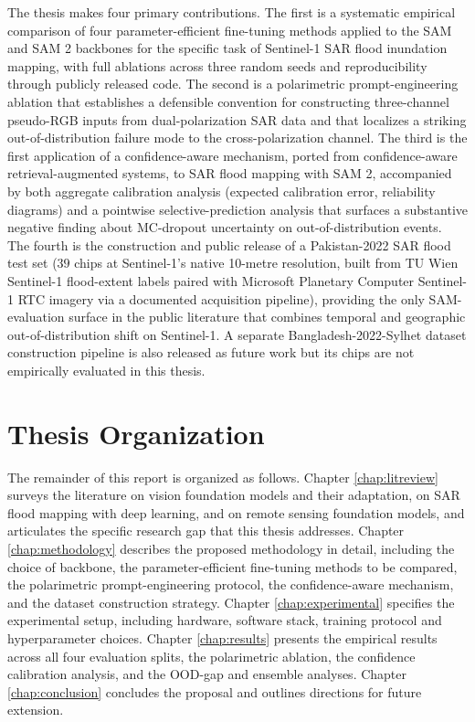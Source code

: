 \documentclass[11pt,a4paper,oneside]{report}
\begin{document}
The thesis makes four primary contributions. The first is a systematic empirical comparison of four parameter-efficient fine-tuning methods applied to the SAM and SAM 2 backbones for the specific task of Sentinel-1 SAR flood inundation mapping, with full ablations across three random seeds and reproducibility through publicly released code. The second is a polarimetric prompt-engineering ablation that establishes a defensible convention for constructing three-channel pseudo-RGB inputs from dual-polarization SAR data and that localizes a striking out-of-distribution failure mode to the cross-polarization channel. The third is the first application of a confidence-aware mechanism, ported from confidence-aware retrieval-augmented systems, to SAR flood mapping with SAM 2, accompanied by both aggregate calibration analysis (expected calibration error, reliability diagrams) and a pointwise selective-prediction analysis that surfaces a substantive negative finding about MC-dropout uncertainty on out-of-distribution events. The fourth is the construction and public release of a Pakistan-2022 SAR flood test set ($39$ chips at Sentinel-1's native 10-metre resolution, built from TU Wien Sentinel-1 flood-extent labels paired with Microsoft Planetary Computer Sentinel-1 RTC imagery via a documented acquisition pipeline), providing the only SAM-evaluation surface in the public literature that combines temporal and geographic out-of-distribution shift on Sentinel-1. A separate Bangladesh-2022-Sylhet dataset construction pipeline is also released as future work but its chips are not empirically evaluated in this thesis.

\section{Thesis Organization}

The remainder of this report is organized as follows. Chapter \ref{chap:litreview} surveys the literature on vision foundation models and their adaptation, on SAR flood mapping with deep learning, and on remote sensing foundation models, and articulates the specific research gap that this thesis addresses. Chapter \ref{chap:methodology} describes the proposed methodology in detail, including the choice of backbone, the parameter-efficient fine-tuning methods to be compared, the polarimetric prompt-engineering protocol, the confidence-aware mechanism, and the dataset construction strategy. Chapter \ref{chap:experimental} specifies the experimental setup, including hardware, software stack, training protocol and hyperparameter choices. Chapter \ref{chap:results} presents the empirical results across all four evaluation splits, the polarimetric ablation, the confidence calibration analysis, and the OOD-gap and ensemble analyses. Chapter \ref{chap:conclusion} concludes the proposal and outlines directions for future extension.
\end{document}
